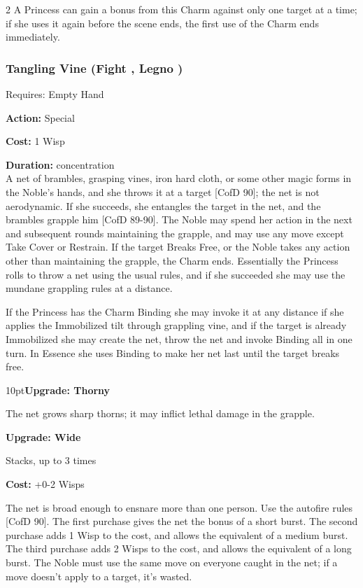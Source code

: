 \begin{multicols}{2}
A Princess can gain a bonus from this Charm against only one target at a time; if she uses it again before the scene ends, the first use of the Charm ends immediately.

\subsubsection*{Tangling Vine (Fight \textbullet\textbullet\textbullet, Legno \textbullet\textbullet)}

\noindent Requires: Empty Hand

\noindent \textbf{Action:} Special

\noindent \textbf{Cost:} 1 Wisp

\noindent \textbf{Duration:} concentration\\

\noindent A net of brambles, grasping vines, iron hard cloth, or some other magic forms in the Noble’s hands, and she throws it at a target [CofD 90]; the net is not aerodynamic. If she succeeds, she entangles the target in the net, and the brambles grapple him [CofD 89-90]. The
Noble may spend her action in the next and subsequent rounds maintaining the grapple, and may use any move except Take Cover or Restrain. If the target Breaks Free, or the Noble takes any action other than maintaining the grapple, the Charm ends. Essentially the Princess rolls to throw a net using the usual rules, and if she succeeded she may use the mundane grappling rules at a distance. 

If the Princess has the Charm Binding she may invoke it at any distance if she applies the Immobilized tilt through grappling vine, and if the target is already Immobilized she may create the net, throw the net and invoke Binding all in one turn. In Essence she uses Binding to make her net last until the target breaks free.

\begin{myindentpar}{10pt}\textbf{Upgrade: Thorny}

The net grows sharp thorns; it may inflict lethal damage in the grapple.

\textbf{Upgrade: Wide}

\noindent Stacks, up to 3 times

\noindent \textbf{Cost:} +0-2 Wisps

The net is broad enough to ensnare more than one person. Use the autofire rules [CofD 90]. The first purchase gives the net the bonus of a short burst. The second purchase adds 1 Wisp to the cost, and allows the equivalent of a medium burst. The third purchase adds 2 Wisps to the cost, and allows the equivalent of a long burst. The Noble must use the same move on everyone caught in the net; if a move doesn’t apply to a target, it’s wasted.\end{myindentpar}


\end{multicols}
